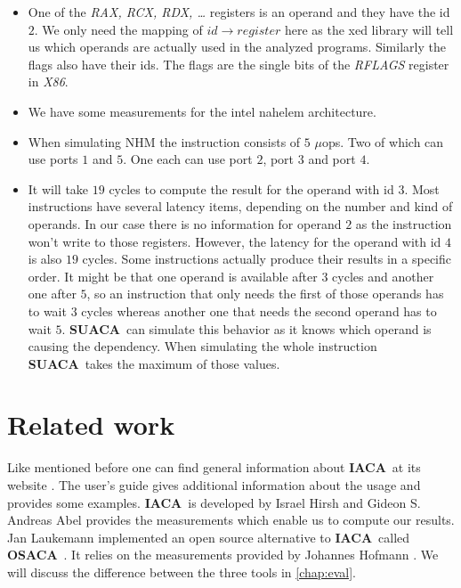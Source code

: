 \documentclass[a4paper,12pt,titlepage, twoside]{report}
\newcommand{\suaca}{\textbf{SUACA}}
\newcommand{\iaca}{\textbf{IACA}}
\newcommand{\osaca}{\textbf{OSACA}}
\newcommand{\microops}{$\mu$ops}
\begin{document}
\begin{itemize}
    \item One of the \emph{RAX, RCX, RDX, \dots} registers is an operand and they have the id $2$. We only need the mapping of $id \rightarrow register$ here as the xed library will tell us which operands are actually used in the analyzed programs. Similarly the flags also have their ids. The flags are the single bits of the \emph{RFLAGS} register in \emph{X86}.
    \item We have some measurements for the intel nahelem architecture.
    \item When simulating NHM the instruction consists of $5$ \microops. Two of which can use ports $1$ and $5$. One each can use port $2$, port $3$ and port $4$.
    \item It will take $19$ cycles to compute the result for the operand with id $3$. Most instructions have several latency items, depending on the number and kind of operands. In our case there is no information for operand $2$ as the instruction won't write to those registers. However, the latency for the operand with id $4$ is also $19$ cycles. Some instructions actually produce their results in a specific order. It might be that one operand is available after $3$ cycles and another one after $5$, so an instruction that only needs the first of those operands has to wait $3$ cycles whereas another one that needs the second operand has to wait $5$. \suaca\ can simulate this behavior as it knows which operand is causing the dependency. When simulating the whole instruction \suaca\ takes the maximum of those values.
\end{itemize}


\section{Related work}

Like mentioned before one can find general information about \iaca\ at its website \cite{iaca}. The user's guide \cite{userguide} gives additional information about the usage and provides some examples. \iaca\ is developed by Israel Hirsh and Gideon S.\\

Andreas Abel \cite{Andreas} provides the measurements which enable us to compute our results.\\

Jan Laukemann \cite{osaca-thesis} implemented an open source alternative to \iaca\ called \osaca\ \cite{osaca-web}. It relies on the measurements provided by Johannes Hofmann \cite{ibench}. We will discuss the difference between the three tools in \autoref{chap:eval}.
\end{document}
